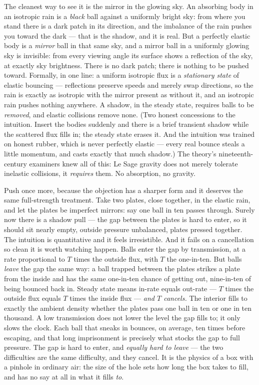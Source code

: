 \documentclass[fontsize=11pt,paper=a4,pagesize=auto,parskip=half-]{scrbook}
\begin{document}
The cleanest way to see it is the mirror in the glowing sky. An absorbing body in an isotropic rain is a \emph{black} ball against a uniformly bright sky: from where you stand there is a dark patch in its direction, and the imbalance of the rain pushes you toward the dark --- that is the shadow, and it is real. But a perfectly elastic body is a \emph{mirror} ball in that same sky, and a mirror ball in a uniformly glowing sky is invisible: from every viewing angle its surface shows a reflection of the sky, at exactly sky brightness. There is no dark patch; there is nothing to be pushed toward. Formally, in one line: a uniform isotropic flux is a \emph{stationary state} of elastic bouncing --- reflections preserve speeds and merely swap directions, so the rain is exactly as isotropic with the mirror present as without it, and an isotropic rain pushes nothing anywhere. A shadow, in the steady state, requires balls to be \emph{removed}, and elastic collisions remove none. (Two honest concessions to the intuition. Insert the bodies suddenly and there is a brief transient shadow while the scattered flux fills in; the steady state erases it. And the intuition was trained on honest rubber, which is never perfectly elastic --- every real bounce steals a little momentum, and casts exactly that much shadow.) The theory's nineteenth-century examiners knew all of this: Le Sage gravity does not merely tolerate inelastic collisions, it \emph{requires} them. No absorption, no gravity.


Push once more, because the objection has a sharper form and it deserves the same full-strength treatment. Take two plates, close together, in the elastic rain, and let the plates be imperfect mirrors: say one ball in ten passes through. Surely now there is a shadow pull --- the gap between the plates is hard to enter, so it should sit nearly empty, outside pressure unbalanced, plates pressed together. The intuition is quantitative and it feels irresistible. And it fails on a cancellation so clean it is worth watching happen. Balls enter the gap by transmission, at a rate proportional to $T$ times the outside flux, with $T$ the one-in-ten. But balls \emph{leave} the gap the same way: a ball trapped between the plates strikes a plate from the inside and has the same one-in-ten chance of getting out, nine-in-ten of being bounced back in. Steady state means in-rate equals out-rate --- $T$ times the outside flux equals $T$ times the inside flux --- \emph{and $T$ cancels.} The interior fills to exactly the ambient density whether the plates pass one ball in ten or one in ten thousand. A low transmission does not lower the level the gap fills to; it only slows the clock. Each ball that sneaks in bounces, on average, ten times before escaping, and that long imprisonment is precisely what stocks the gap to full pressure. The gap is hard to enter, and \emph{equally hard to leave} --- the two difficulties are the same difficulty, and they cancel. It is the physics of a box with a pinhole in ordinary air: the size of the hole sets how long the box takes to fill, and has no say at all in what it fills \emph{to}.
\end{document}

